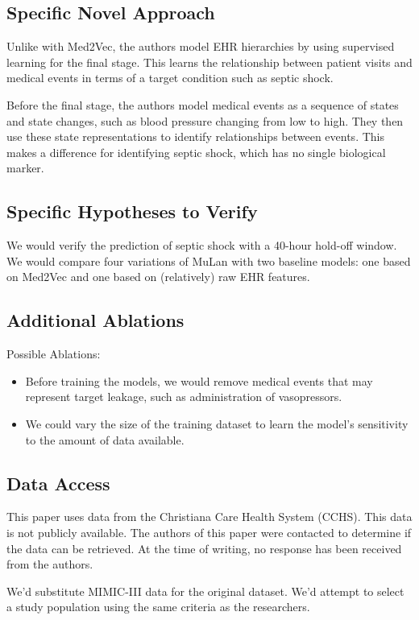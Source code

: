 \documentclass[11pt,a4paper]{article}
\begin{document}
\subsection{Specific Novel Approach}
Unlike with Med2Vec, the authors model EHR hierarchies by using supervised learning for the final stage. This learns the relationship between patient visits and medical events in terms of a target condition such as septic shock.

Before the final stage, the authors model medical events as a sequence of states and state changes, such as blood pressure changing from low to high. They then use these state representations to identify relationships between events. This makes a difference for identifying septic shock, which has no single biological marker.

\subsection{Specific Hypotheses to Verify}
We would verify the prediction of septic shock with a 40-hour hold-off window. We would compare four variations of MuLan with two baseline models: one based on Med2Vec and one based on (relatively) raw EHR features.

\subsection{Additional Ablations}
Possible Ablations:
\begin{itemize}
  \item Before training the models, we would remove medical events that may represent target leakage, such as administration of vasopressors.
  \item We could vary the size of the training dataset to learn the model's sensitivity to the amount of data available.
\end{itemize}

\subsection{Data Access}
This paper uses data from the Christiana Care Health System (CCHS). This data is not publicly available. The authors of this paper were contacted to determine if the data can be retrieved. At the time of writing, no response has been received from the authors.

We'd substitute MIMIC-III data for the original dataset. We'd attempt to select a study population using the same criteria as the researchers.
\end{document}
